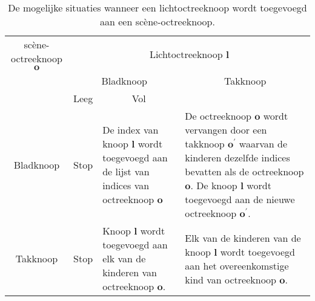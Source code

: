\begin{table}
  \begin{tabularx}{\textwidth}{ccXX}\toprule
    sc\`ene-octreeknoop $\mathbf{o}$ & \multicolumn{3}{c}{Lichtoctreeknoop $\mathbf{l}$}                            \\
                                  & \multicolumn{2}{c}{Bladknoop}                      & \multicolumn{1}{c}{Takknoop} \\
                                  & \multicolumn{1}{c}{Leeg} & \multicolumn{1}{c}{Vol} &                              \\ \midrule
    Bladknoop &
      Stop &
    
      De index van knoop $\mathbf{l}$ wordt toegevoegd aan de lijst van
      indices van octreeknoop $\mathbf{o}$ &

      De octreeknoop $\mathbf{o}$ wordt vervangen door een takknoop
      $\mathbf{o}^\prime$ waarvan de kinderen dezelfde indices bevatten als de
      octreeknoop $\mathbf{o}$. De knoop $\mathbf{l}$ wordt toegevoegd
      aan de nieuwe octreeknoop $\mathbf{o}^\prime$. \\

    Takknoop &
      Stop &

      Knoop $\mathbf{l}$ wordt toegevoegd aan elk van de kinderen van
      octreeknoop $\mathbf{o}$. &

      Elk van de kinderen van de knoop $\mathbf{l}$ wordt toegevoegd aan
      het overeenkomstige kind van octreeknoop $\mathbf{o}$. \\ \bottomrule
  \end{tabularx}
  \caption{De mogelijke situaties wanneer een lichtoctreeknoop wordt
           toegevoegd aan een sc\`ene-octreeknoop.}
  \label{tbl:hs-lichtoctree}
\end{table}
